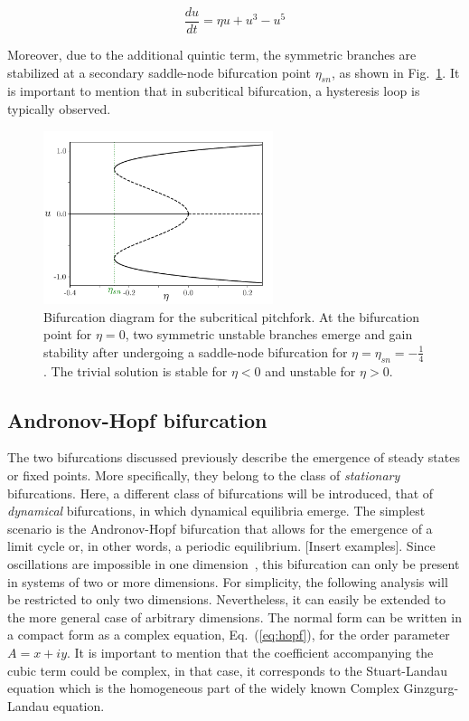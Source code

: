 \begin{equation}
    \dfrac{du}{dt} = \eta u + u ^ 3 - u^5
    \label{eq:pre_bif_pitchfork_subcritical}
\end{equation}

Moreover, due to the additional quintic term, the symmetric branches are stabilized 
at a secondary saddle-node bifurcation point $\eta_{sn}$, as shown
in Fig.~\ref{fig:pre_bif_subpitchfork}. It is important to mention that in subcritical
bifurcation, a hysteresis loop is typically observed. 

\begin{figure}[h]
    \centering
    \includegraphics[width=0.6\textwidth]{imagenes/framework/bif_pitch_subcritical.pdf}
    \caption{Bifurcation diagram for the subcritical pitchfork. At the bifurcation point
    for $\eta=0$, two symmetric unstable branches emerge and gain stability after undergoing
    a saddle-node bifurcation for $\eta=\eta_{sn}=-\frac14$. The trivial solution is stable for $\eta < 0$
    and unstable for $\eta > 0$.}
    \label{fig:pre_bif_subpitchfork}
\end{figure}


\subsection{Andronov-Hopf bifurcation}

The two bifurcations discussed previously describe the emergence of steady states or fixed points. 
More specifically, they belong to the class of {\em stationary} bifurcations. Here, a different class of bifurcations will be introduced,
that of {\em dynamical} bifurcations, in which dynamical equilibria emerge. The simplest scenario is the Andronov-Hopf bifurcation
that allows for the emergence of a limit cycle or, in other words, a periodic equilibrium. [Insert examples]. Since oscillations are impossible in 
one dimension~\cite{strogatz2018nonlinear}, this bifurcation can only be present in systems of two or more dimensions. For simplicity, the following
analysis will be restricted to only two dimensions. Nevertheless, it can easily be extended to the more general case of arbitrary dimensions.
The normal form can be written in a compact form as a complex equation, Eq.~(\ref{eq:hopf}), for the
order parameter $A = x +iy$. It is important to mention that
the coefficient accompanying the cubic term could be complex, in that case, it corresponds to the Stuart-Landau equation which
is the homogeneous part of the widely known Complex Ginzgurg-Landau equation.

